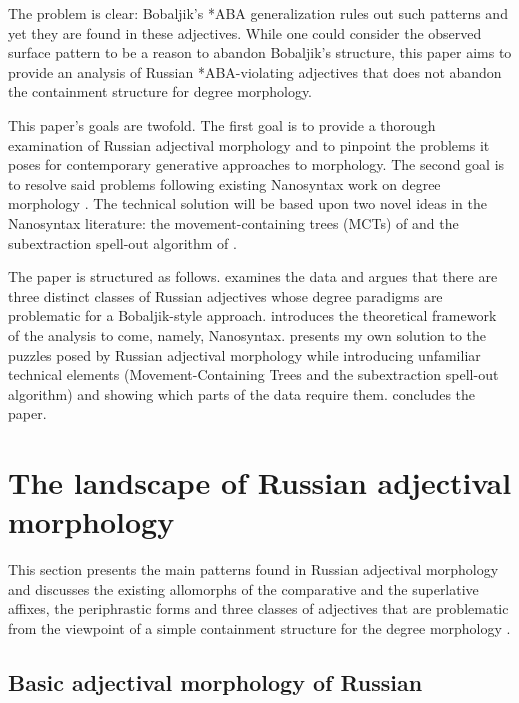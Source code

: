 \documentclass[output=paper,colorlinks,citecolor=brown]{langscibook}
\begin{document}
The problem is clear: Bobaljik's *ABA generalization rules out such patterns and yet they are found in these adjectives. While one could consider the observed surface pattern to be a reason to abandon Bobaljik's structure, this paper aims to provide an analysis of Russian *ABA-violating adjectives that does not abandon the containment structure for degree morphology.

This paper's goals are twofold. The first goal is to provide a thorough examination of Russian adjectival morphology and to pinpoint the problems it poses for contemporary generative approaches to morphology. The second goal is to resolve said problems following existing Nanosyntax work on degree morphology \citep{Caha:2019,VandenWyngaerd:2020,Caha:2023}. The technical solution will be based upon two novel ideas in the Nanosyntax literature: the movement-containing trees (MCTs) of \citet{Blix:2022} and the subextraction spell-out algorithm of \citet{Caha:2022b,Caha:2023}. 

The paper is structured as follows.  examines the data and argues that there are three distinct classes of Russian adjectives whose degree paradigms are problematic for a Bobaljik-style approach.  introduces the theoretical framework of the analysis to come, namely, Nanosyntax.  presents my own solution to the puzzles posed by Russian adjectival morphology while introducing unfamiliar technical elements (Movement-Containing Trees and the subextraction spell-out algorithm) and showing which parts of the data require them.  concludes the paper. 

\section{The landscape of Russian adjectival morphology}\label{kas:sec:data}

This section presents the main patterns found in Russian adjectival morphology and discusses the existing allomorphs of the comparative and the superlative affixes, the periphrastic forms and three classes of adjectives that are problematic from the viewpoint of a simple containment structure for the degree morphology \citep{Bobaljik:2012}.

\subsection{Basic adjectival morphology of Russian}
\end{document}
